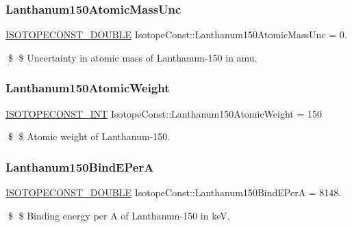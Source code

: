 \subsubsection{\texorpdfstring{Lanthanum150\+Atomic\+Mass\+Unc}{Lanthanum150AtomicMassUnc}}
{\footnotesize\ttfamily \mbox{\hyperlink{group___isotope_const-_macros_ga8f45a7272ce02c0b4c65c44636ed719a}{I\+S\+O\+T\+O\+P\+E\+C\+O\+N\+S\+T\+\_\+\+D\+O\+U\+B\+LE}} Isotope\+Const\+::\+Lanthanum150\+Atomic\+Mass\+Unc = 0.}

\$ \$ Uncertainty in atomic mass of Lanthanum-\/150 in amu. \mbox{\label{group___isotope_const-_lanthanum-_la150_ga33cf52e8632588bef35d27e12f0f4b7c}} 
\subsubsection{\texorpdfstring{Lanthanum150\+Atomic\+Weight}{Lanthanum150AtomicWeight}}
{\footnotesize\ttfamily \mbox{\hyperlink{group___isotope_const-_macros_ga5f18360b3e99483a35c32d789e62621c}{I\+S\+O\+T\+O\+P\+E\+C\+O\+N\+S\+T\+\_\+\+I\+NT}} Isotope\+Const\+::\+Lanthanum150\+Atomic\+Weight = 150}

\$ \$ Atomic weight of Lanthanum-\/150. \mbox{\label{group___isotope_const-_lanthanum-_la150_ga5162d38018d51ed3d2e2ad57b35262cc}} 
\subsubsection{\texorpdfstring{Lanthanum150\+Bind\+E\+PerA}{Lanthanum150BindEPerA}}
{\footnotesize\ttfamily \mbox{\hyperlink{group___isotope_const-_macros_ga8f45a7272ce02c0b4c65c44636ed719a}{I\+S\+O\+T\+O\+P\+E\+C\+O\+N\+S\+T\+\_\+\+D\+O\+U\+B\+LE}} Isotope\+Const\+::\+Lanthanum150\+Bind\+E\+PerA = 8148.}

\$ \$ Binding energy per A of Lanthanum-\/150 in keV. \mbox{\label{group___isotope_const-_lanthanum-_la150_ga5c864ed4748572f2b13c236f3978333a}} 
